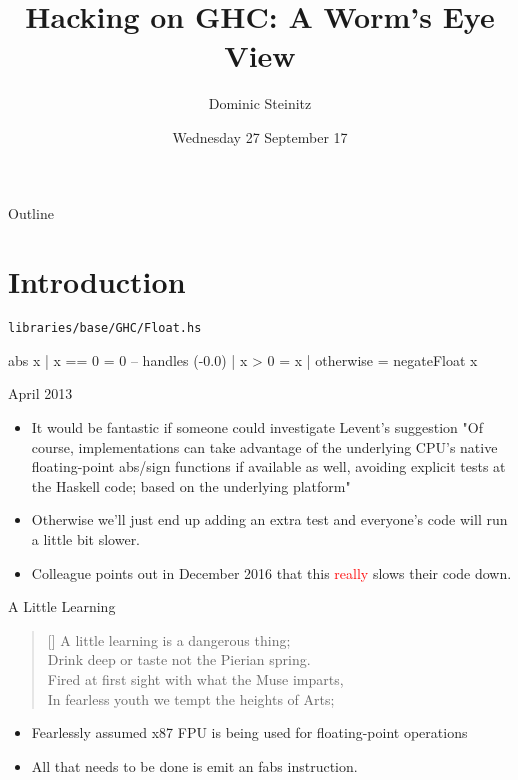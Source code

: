 \documentclass[presentation]{beamer}
\author{Dominic Steinitz}
\date{Wednesday 27 September 17}
\title{Hacking on GHC: A Worm's Eye View}
\begin{document}
\maketitle
\begin{frame}{Outline}
\tableofcontents
\end{frame}


\section{Introduction}

\begin{frame}[fragile]{\texttt{libraries/base/GHC/Float.hs}}

\begin{haskelL}
  abs x | x == 0 = 0 -- handles (-0.0)
        | x > 0 = x
        | otherwise = negateFloat x
\end{haskelL}
\end{frame}

\begin{frame}{April 2013}

  \begin{itemize}
    \item
        It would be fantastic if someone could
        investigate Levent's suggestion "Of course,
        implementations can take advantage of the
        underlying CPU's native floating-point
        abs/sign functions if available as well,
        avoiding explicit tests at the Haskell code;
        based on the underlying platform"
      \item
        Otherwise we'll just end up adding an extra test
        and everyone's code will run a little bit slower.
      \item Colleague points out in December 2016
        that this \textcolor{red}{really} slows their code down.
    \end{itemize}

\end{frame}

\begin{frame}{A Little Learning}

  \settowidth{\versewidth}{Fired at first sight with what the Muse imparts,}
  \begin{verse}[\versewidth]
    A little learning is a dangerous thing; \\
    Drink deep or taste not the Pierian spring. \\
    Fired at first sight with what the Muse imparts, \\
    In fearless youth we tempt the heights of Arts;
  \end{verse}

  \begin{itemize}
    \item
      Fearlessly assumed x87 FPU is being used for
      floating-point operations
    \item All that needs to be done is emit an
      fabs instruction.
    \end{itemize}

\end{frame}
\end{document}
